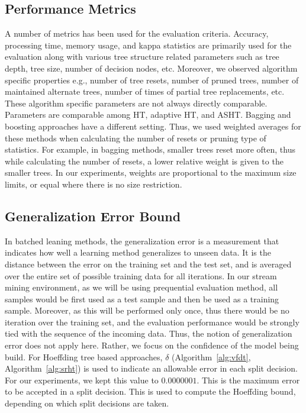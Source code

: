 \subsection{Performance Metrics}
A number of metrics has been used for the evaluation criteria. Accuracy, processing time, memory usage, and kappa statistics are primarily used for the evaluation along with various tree structure related parameters such as tree depth, tree size, number of decision nodes, etc. Moreover, we observed algorithm specific properties e.g., number of tree resets, number of pruned trees, number of maintained alternate trees, number of times of partial tree replacements, etc. These algorithm specific parameters are not always directly comparable. Parameters are comparable among HT, adaptive HT, and ASHT. Bagging and boosting approaches have a different setting. Thus, we used weighted averages for these methods when calculating the number of resets or pruning type of statistics. For example, in bagging methods, smaller trees reset more often, thus while calculating the number of resets, a lower relative weight is given to the smaller trees. In our experiments, weights are proportional to the maximum size limits, or equal where there is no size restriction.

\subsection{Generalization Error Bound}
In batched leaning methods, the generalization error is a measurement that indicates how well a learning method generalizes to unseen data. It is the distance between the error on the training set and the test set, and is averaged over the entire set of possible training data for all iterations. In our stream mining environment, as we will be using prequential evaluation method, all samples would be first used as a test sample and then be used as a training sample. Moreover, as this will be performed only once, thus there would be no iteration over the training set, and the evaluation performance would be strongly tied with the sequence of  the incoming data. Thus, the notion of generalization error does not apply here. Rather, we focus on the confidence of the model being build. For Hoeffding tree based approaches, $\delta$ (Algorithm~\ref{alg:vfdt}, Algorithm~\ref{alg:srht}) is used to indicate an allowable error in each split decision. For our experiments, we kept this value to $0.0000001$. This is the maximum error to be accepted in a split decision. This is used to compute the Hoeffding bound, depending on which split decisions are taken.


